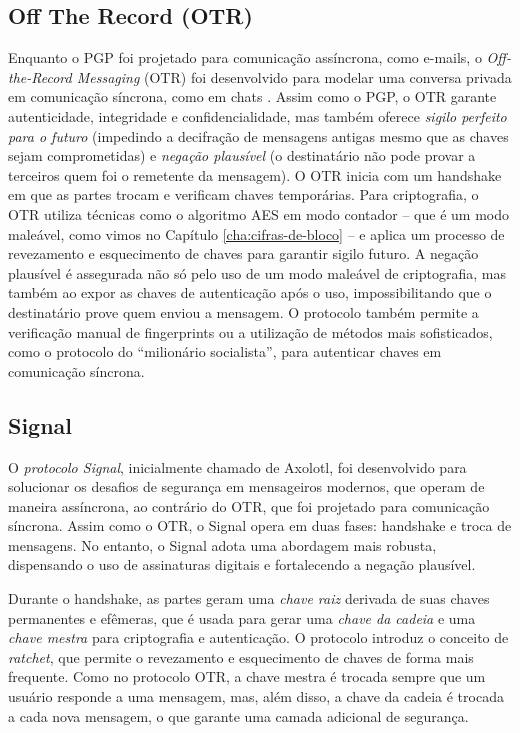 \subsection{Off The Record (OTR)}

Enquanto o PGP foi projetado para comunicação assíncrona, como e-mails, o {\em Off-the-Record Messaging} (OTR) foi desenvolvido para modelar uma conversa privada em comunicação síncrona, como em chats \cite{Borisov04}.
Assim como o PGP, o OTR garante autenticidade, integridade e confidencialidade, mas também oferece {\em sigilo perfeito para o futuro} (impedindo a decifração de mensagens antigas mesmo que as chaves sejam comprometidas) e {\em negação plausível} (o destinatário não pode provar a terceiros quem foi o remetente da mensagem).
O OTR inicia com um handshake em que as partes trocam e verificam chaves temporárias. Para criptografia, o OTR utiliza técnicas como o algoritmo AES em modo contador -- que é um modo maleável, como vimos no Capítulo \ref{cha:cifras-de-bloco} -- e aplica um processo de revezamento e esquecimento de chaves para garantir sigilo futuro.
A negação plausível é assegurada não só pelo uso de um modo maleável de criptografia, mas também ao expor as chaves de autenticação após o uso, impossibilitando que o destinatário prove quem enviou a mensagem.
O protocolo também permite a verificação manual de fingerprints ou a utilização de métodos mais sofisticados, como o protocolo do ``milionário socialista'', para autenticar chaves em comunicação síncrona.

\subsection{Signal}

O \textit{protocolo Signal}, inicialmente chamado de Axolotl, foi desenvolvido para solucionar os desafios de segurança em mensageiros modernos, que operam de maneira assíncrona, ao contrário do OTR, que foi projetado para comunicação síncrona. Assim como o OTR, o Signal opera em duas fases: handshake e troca de mensagens. No entanto, o Signal adota uma abordagem mais robusta, dispensando o uso de assinaturas digitais e fortalecendo a negação plausível.

Durante o handshake, as partes geram uma {\em chave raiz} derivada de suas chaves permanentes e efêmeras, que é usada para gerar uma {\em chave da cadeia} e uma {\em chave mestra} para criptografia e autenticação.
O protocolo introduz o conceito de \textit{ratchet}, que permite o revezamento e esquecimento de chaves de forma mais frequente.
Como no protocolo OTR, a chave mestra é trocada sempre que um usuário responde a uma mensagem, mas, além disso, a chave da cadeia é trocada a cada nova mensagem, o que garante uma camada adicional de segurança.

